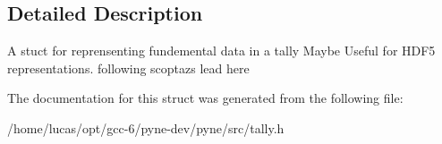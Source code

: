 \subsection{Detailed Description}
A stuct for reprensenting fundemental data in a tally Maybe Useful for H\+D\+F5 representations. following scoptaz\textquotesingle{}s lead here 

The documentation for this struct was generated from the following file\+:\begin{DoxyCompactItemize}
\item 
/home/lucas/opt/gcc-\/6/pyne-\/dev/pyne/src/tally.\+h\end{DoxyCompactItemize}
